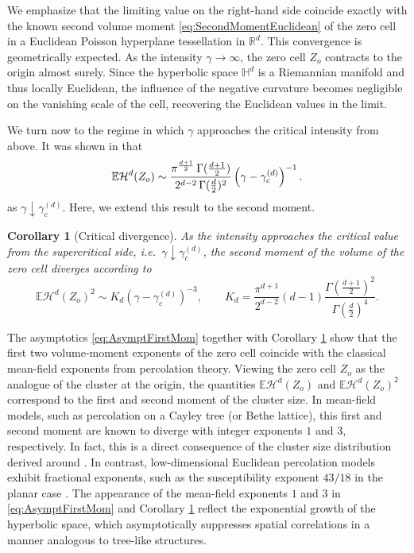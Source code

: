 \documentclass[11pt,a4paper]{article}
\theoremstyle{plain}
\newtheorem{corollary}[theorem]{Corollary}
\theoremstyle{definition}
\theoremstyle{remark}
\def\EE{\mathbb{E}}
\def\cH{\mathcal{H}}
\begin{document}
We emphasize that the limiting value on the right-hand side coincide exactly with the known second volume moment \eqref{eq:SecondMomentEuclidean} of the zero cell in a Euclidean Poisson hyperplane tessellation in $\mathbb{R}^d$. This convergence is geometrically expected. As the intensity $\gamma \to \infty$, the zero cell $Z_o$ contracts to the origin almost surely. Since the hyperbolic space $\mathbb{H}^d$ is a Riemannian manifold and thus locally Euclidean, the influence of the negative curvature becomes negligible on the vanishing scale of the cell, recovering the Euclidean values in the limit.

We turn now to the regime in which $\gamma$ approaches the critical intensity from above. It was shown in \cite[Remark 7.2]{BuehlerHugThaeleBM} that 
\begin{equation}\label{eq:AsymptFirstMom}
\EE\cH^d(Z_o) \sim \frac{\pi^{{d+1\over 2}}\,\Gamma(\frac{d+1}{2})}{2^{d-2}\,\Gamma(\frac{d}{2})^2} \left( \gamma - \gamma_c^{(d)} \right)^{-1}. 
\end{equation}
as $\gamma\downarrow\gamma_c^{(d)}$. Here, we extend this result to the second moment.


\begin{corollary}[Critical divergence]\label{cor:GammaToCritical_d}
	As the intensity approaches the critical value from the supercritical side, i.e.\ $\gamma \downarrow \gamma_c^{(d)}$, the second moment of the volume of the zero cell diverges according to
	\[
	\EE\cH^d(Z_o)^2 \sim K_d \left( \gamma - \gamma_c^{(d)} \right)^{-3},\qquad K_d = \frac{\pi^{d+1}}{2^{d-2}} (d-1) \frac{\Gamma\left(\frac{d+1}{2}\right)^2}{\Gamma\left(\frac{d}{2}\right)^4}.
	\]
\end{corollary}

The asymptotics \eqref{eq:AsymptFirstMom} together with Corollary \ref{cor:GammaToCritical_d} show that the first two volume-moment exponents of the zero cell coincide with the classical mean-field exponents from percolation theory. Viewing the zero cell $Z_o$ as the analogue of the cluster at the origin, the quantities $\EE\cH^d(Z_o)$ and $\EE\cH^d(Z_o)^2$ correspond to the first and second moment of the cluster size. In mean-field models, such as percolation on a Cayley tree (or Bethe lattice), this first and second moment are known to diverge with integer exponents $1$ and $3$, respectively. In fact, this is a direct consequence of the cluster size distribution derived around \cite[Equation (10.9)]{Grimmett}. In contrast, low-dimensional Euclidean percolation models exhibit fractional exponents, such as the susceptibility exponent $43/18$ in the planar case \cite[Table 10.1]{Grimmett}. The appearance of the mean-field exponents $1$ and $3$ in \eqref{eq:AsymptFirstMom} and Corollary \ref{cor:GammaToCritical_d} reflect the exponential growth of the hyperbolic space, which asymptotically suppresses spatial correlations in a manner analogous to tree-like structures.
\end{document}
